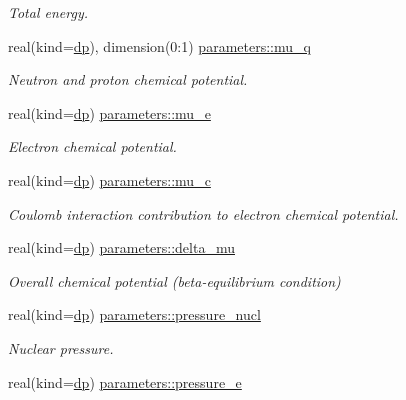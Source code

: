 \begin{DoxyCompactItemize}
\begin{DoxyCompactList}\small\item\em Total energy. \end{DoxyCompactList}\item 
real(kind=\mbox{\hyperlink{namespaceparameters_a52f8c6351fd79345d8811e065bcbbb37}{dp}}), dimension(0\+:1) \mbox{\hyperlink{group__WS__PROPERTIES_ga640fd108640984ca51ba2f7cc29f2a8f}{parameters\+::mu\+\_\+q}}
\begin{DoxyCompactList}\small\item\em Neutron and proton chemical potential. \end{DoxyCompactList}\item 
real(kind=\mbox{\hyperlink{namespaceparameters_a52f8c6351fd79345d8811e065bcbbb37}{dp}}) \mbox{\hyperlink{group__WS__PROPERTIES_gacc0c124d82adcdfb692fb32f9e736bca}{parameters\+::mu\+\_\+e}}
\begin{DoxyCompactList}\small\item\em Electron chemical potential. \end{DoxyCompactList}\item 
real(kind=\mbox{\hyperlink{namespaceparameters_a52f8c6351fd79345d8811e065bcbbb37}{dp}}) \mbox{\hyperlink{group__WS__PROPERTIES_ga3025178429abf0548bda508408facd69}{parameters\+::mu\+\_\+c}}
\begin{DoxyCompactList}\small\item\em Coulomb interaction contribution to electron chemical potential. \end{DoxyCompactList}\item 
real(kind=\mbox{\hyperlink{namespaceparameters_a52f8c6351fd79345d8811e065bcbbb37}{dp}}) \mbox{\hyperlink{group__WS__PROPERTIES_ga44464a0deab6ab30fe9c2301379ceb71}{parameters\+::delta\+\_\+mu}}
\begin{DoxyCompactList}\small\item\em Overall chemical potential (beta-\/equilibrium condition) \end{DoxyCompactList}\item 
real(kind=\mbox{\hyperlink{namespaceparameters_a52f8c6351fd79345d8811e065bcbbb37}{dp}}) \mbox{\hyperlink{group__WS__PROPERTIES_ga769d654b2408c30dca03771d09945c2a}{parameters\+::pressure\+\_\+nucl}}
\begin{DoxyCompactList}\small\item\em Nuclear pressure. \end{DoxyCompactList}\item 
real(kind=\mbox{\hyperlink{namespaceparameters_a52f8c6351fd79345d8811e065bcbbb37}{dp}}) \mbox{\hyperlink{group__WS__PROPERTIES_ga72c16e4c25186b788d7d47eb8c87c3a4}{parameters\+::pressure\+\_\+e}}

\end{DoxyCompactItemize}
